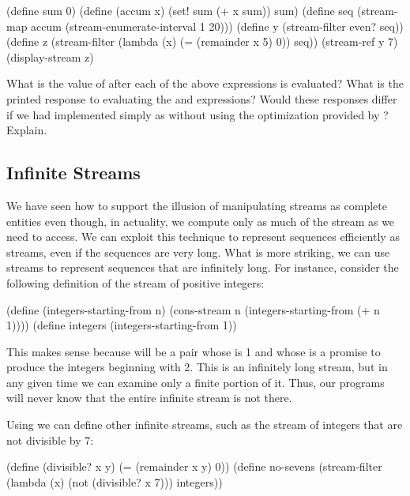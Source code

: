 \begin{exerciseGroup}
\begin{codeBlock}
(define sum 0)
(define (accum x) (set! sum (+ x sum)) sum)
(define seq
  (stream-map accum
              (stream-enumerate-interval 1 20)))
(define y (stream-filter even? seq))
(define z
  (stream-filter (lambda (x) (= (remainder x 5) 0))
                 seq))
(stream-ref y 7)
(display-stream z)
\end{codeBlock}

What is the value of  after each of the above expressions is
evaluated?  What is the printed response to evaluating the 
and  expressions?  Would these responses differ if we had
implemented  simply as
without using the optimization provided by ?  Explain.
\end{exerciseGroup}

\subsection{Infinite Streams}
\label{Section 3.5.2}

We have seen how to support the illusion of manipulating streams as complete
entities even though, in actuality, we compute only as much of the stream as we
need to access.  We can exploit this technique to represent sequences
efficiently as streams, even if the sequences are very long.  What is more
striking, we can use streams to represent sequences that are infinitely long.
For instance, consider the following definition of the stream of positive
integers:

\begin{codeBlock}
(define (integers-starting-from n)
  (cons-stream n (integers-starting-from (+ n 1))))
(define integers (integers-starting-from 1))
\end{codeBlock}

\noindent
This makes sense because  will be a pair whose  is 1
and whose  is a promise to produce the integers beginning with 2.
This is an infinitely long stream, but in any given time we can examine only a
finite portion of it.  Thus, our programs will never know that the entire
infinite stream is not there.

Using  we can define other infinite streams, such as the stream
of integers that are not divisible by 7:

\begin{codeBlock}
(define (divisible? x y) (= (remainder x y) 0))
(define no-sevens
  (stream-filter (lambda (x) (not (divisible? x 7)))
                 integers))
\end{codeBlock}

